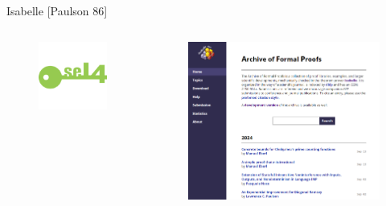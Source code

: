 \documentclass[17pt]{beamer}
\begin{document}
\begin{frame}{Isabelle {\small [Paulson 86]}}
\begin{columns}
\begin{column}{0.25\textwidth}
\begin{figure}
                \includegraphics[width=0.9\linewidth]{./images/sel4-logo.png}
            \end{figure}
        \end{column}
        \begin{column}{0.35\textwidth}
            \vspace{-20pt} 
            \begin{figure}
                \includegraphics[width=0.8\linewidth]{./images/isabelle_archive.png}
            \end{figure}
        \end{column}
    \end{columns}
\end{frame}
\end{document}
